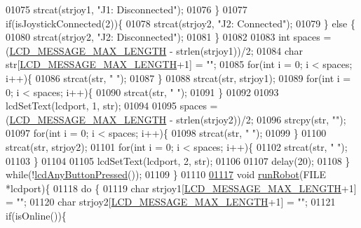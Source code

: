 \begin{DoxyCode}
{{{{{{{{{{{{{{01075             strcat(strjoy1, \textcolor{stringliteral}{"J1: Disconnected"});
01076         \}
01077         \textcolor{keywordflow}{if}(isJoystickConnected(2))\{
01078             strcat(strjoy2, \textcolor{stringliteral}{"J2: Connected"});
01079         \} \textcolor{keywordflow}{else} \{
01080             strcat(strjoy2, \textcolor{stringliteral}{"J2: Disconnected"});
01081         \}
01082 
01083         \textcolor{keywordtype}{int} spaces = (\hyperlink{lcdmsg_8h_abe4c4b70fc6f44ae3680e5b2c68cdd00}{LCD\_MESSAGE\_MAX\_LENGTH} - strlen(strjoy1))/2;
01084         \textcolor{keywordtype}{char} str[\hyperlink{lcdmsg_8h_abe4c4b70fc6f44ae3680e5b2c68cdd00}{LCD\_MESSAGE\_MAX\_LENGTH}+1] = \textcolor{stringliteral}{""};
01085         \textcolor{keywordflow}{for}(\textcolor{keywordtype}{int} i = 0; i < spaces; i++)\{
01086             strcat(str, \textcolor{stringliteral}{" "});
01087         \}
01088         strcat(str, strjoy1);
01089         \textcolor{keywordflow}{for}(\textcolor{keywordtype}{int} i = 0; i < spaces; i++)\{
01090             strcat(str, \textcolor{stringliteral}{" "});
01091         \}
01092 
01093         lcdSetText(lcdport, 1, str);
01094 
01095         spaces = (\hyperlink{lcdmsg_8h_abe4c4b70fc6f44ae3680e5b2c68cdd00}{LCD\_MESSAGE\_MAX\_LENGTH} - strlen(strjoy2))/2;
01096         strcpy(str, \textcolor{stringliteral}{""});
01097         \textcolor{keywordflow}{for}(\textcolor{keywordtype}{int} i = 0; i < spaces; i++)\{
01098             strcat(str, \textcolor{stringliteral}{" "});
01099         \}
01100         strcat(str, strjoy2);
01101         \textcolor{keywordflow}{for}(\textcolor{keywordtype}{int} i = 0; i < spaces; i++)\{
01102             strcat(str, \textcolor{stringliteral}{" "});
01103         \}
01104 
01105         lcdSetText(lcdport, 2, str);
01106 
01107         delay(20);
01108     \} \textcolor{keywordflow}{while}(!\hyperlink{lcddiag_8h_a0592813f995bfeeadb9bee923833ed35}{lcdAnyButtonPressed}());
01109 \}
01110 
\hypertarget{lcddiag_8c_source.tex_l01117}{}\hyperlink{lcddiag_8c_a7154650020a551de49d976659df81a9d}{01117} \textcolor{keywordtype}{void} \hyperlink{lcddiag_8c_a7154650020a551de49d976659df81a9d}{runRobot}(FILE *lcdport)\{
01118     \textcolor{keywordflow}{do} \{
01119         \textcolor{keywordtype}{char} strjoy1[\hyperlink{lcdmsg_8h_abe4c4b70fc6f44ae3680e5b2c68cdd00}{LCD\_MESSAGE\_MAX\_LENGTH}+1] = \textcolor{stringliteral}{""};
01120         \textcolor{keywordtype}{char} strjoy2[\hyperlink{lcdmsg_8h_abe4c4b70fc6f44ae3680e5b2c68cdd00}{LCD\_MESSAGE\_MAX\_LENGTH}+1] = \textcolor{stringliteral}{""};
01121         \textcolor{keywordflow}{if}(isOnline())\{
}}}}}}}}}}}}}}
\end{DoxyCode}
